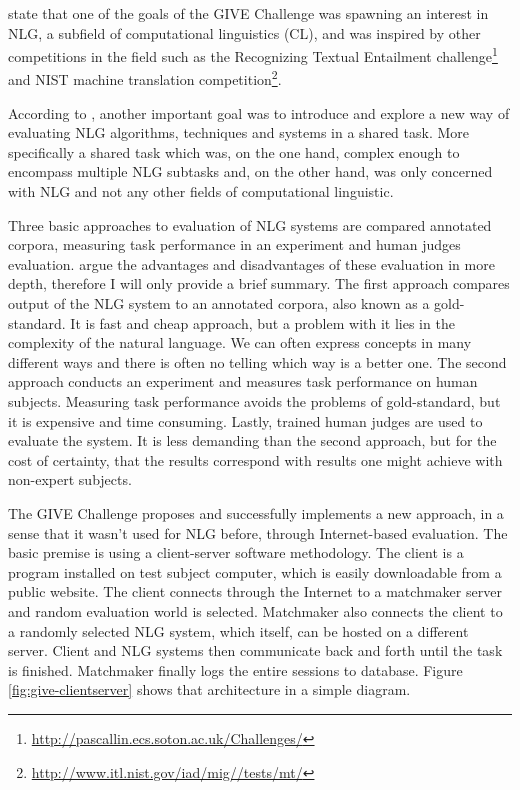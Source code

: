 \citet{koller2010first} state that one of the goals of the GIVE Challenge was spawning an interest in NLG, a subfield of computational linguistics (CL), and was inspired by other competitions in the field such as the Recognizing Textual Entailment challenge\footnote{\url{http://pascallin.ecs.soton.ac.uk/Challenges/}} and NIST machine
translation competition\footnote{\url{http://www.itl.nist.gov/iad/mig//tests/mt/}}.

According to \citet{koller2010first}, another important goal was to introduce and explore a new way of evaluating NLG algorithms, techniques and systems in a shared task. More specifically a shared task which was, on the one hand, complex enough to encompass multiple NLG subtasks and, on the other hand, was only concerned with NLG and not any other fields of computational linguistic.

Three basic approaches to evaluation of NLG systems are compared annotated corpora, measuring task performance in an experiment and human judges evaluation. \citet{koller2010first} argue the advantages and disadvantages of these evaluation in more depth, therefore I will only provide a brief summary. The first approach compares output of the NLG system to an annotated corpora, also known as a gold-standard. It is fast and cheap approach, but a problem with it lies in the complexity of the natural language. We can often express concepts in many different ways and there is often no telling which way is a better one. The second approach conducts an experiment and measures task performance on human subjects. Measuring task performance avoids the problems of gold-standard, but it is expensive and time consuming. Lastly, trained human judges are used to evaluate the system. It is less demanding than the second approach, but for the cost of certainty, that the results correspond with results one might achieve with non-expert subjects.

The GIVE Challenge proposes and successfully implements a new approach, in a sense that it wasn't used for NLG before, through Internet-based evaluation. The basic premise is using a client-server software methodology. The client is a program installed on test subject computer, which is easily downloadable from a public website. The client connects through the Internet to a matchmaker server and random evaluation world is selected. Matchmaker also connects the client to a randomly selected NLG system, which itself, can be hosted on a different server. Client and NLG systems then communicate back and forth until the task is finished. Matchmaker finally logs the entire sessions to database. Figure \ref{fig:give-clientserver} shows that architecture in a simple diagram.

